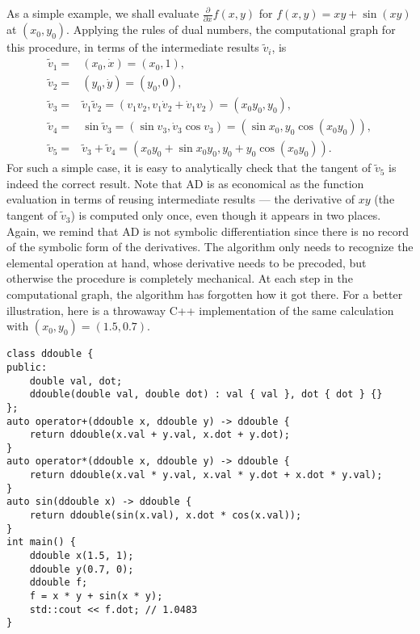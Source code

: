 \documentclass{article}
\begin{document}
As a simple example, we shall evaluate $\frac{\partial}{\partial x} f(x, y)$ for $f(x, y) = x y + \sin (xy)$ at $(x_0,y_0)$. Applying the rules of dual numbers, the computational graph for this procedure, in terms of the intermediate results $\tilde v_i$, is
\begin{equation}
  \label{eq:forward_example}
  \begin{split}
    \tilde v_1 =& (x_0,\dot x) = (x_0,1), \\
    \tilde v_2 =& (y_0,\dot y) = (y_0,0), \\
    \tilde v_3 =& \tilde v_1\tilde v_2 = (v_1v_2, v_1 \dot v_2 +
    \dot v_1 v_2) = (x_0y_0, y_0), \\
    \tilde v_4 =& \sin \tilde v_3 = (\sin v_3, \dot v_3 \cos v_3) =
    (\sin x_0, y_0 \cos (x_0y_0)), \\
    \tilde v_5 =& \tilde v_3 + \tilde v_4 = (x_0y_0 + \sin x_0y_0, y_0
    + y_0 \cos (x_0y_0)).
  \end{split}
\end{equation}
For such a simple case, it is easy to analytically check that the tangent of $\tilde v_5$ is indeed the correct result. Note that AD is as economical as the function evaluation in terms of reusing intermediate results --- the derivative of $xy$ (the tangent of $\tilde v_3$) is computed only once, even though it appears in two places. Again, we remind that AD is not symbolic differentiation since there is no record of the symbolic form of the derivatives. The algorithm only needs to recognize the elemental operation at hand, whose derivative needs to be precoded, but otherwise the procedure is completely mechanical. At each step in the computational graph, the algorithm has forgotten how it got there. For a better illustration, here is a throwaway C++ implementation of the same calculation with $(x_0,y_0) = (1.5,0.7)$.
\begin{verbatim}
class ddouble {
public:
    double val, dot;
    ddouble(double val, double dot) : val { val }, dot { dot } {}
};
auto operator+(ddouble x, ddouble y) -> ddouble {
    return ddouble(x.val + y.val, x.dot + y.dot);
}
auto operator*(ddouble x, ddouble y) -> ddouble {
    return ddouble(x.val * y.val, x.val * y.dot + x.dot * y.val);
}
auto sin(ddouble x) -> ddouble {
    return ddouble(sin(x.val), x.dot * cos(x.val));
}
int main() {
    ddouble x(1.5, 1);
    ddouble y(0.7, 0);
    ddouble f;
    f = x * y + sin(x * y);
    std::cout << f.dot; // 1.0483
}
\end{verbatim}
\end{document}
